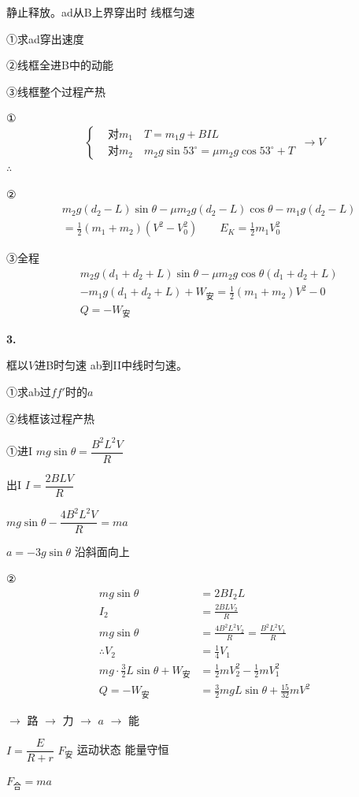 \begin{problem}
静止释放。ad从B上界穿出时 线框匀速

①求ad穿出速度

②线框全进B中的动能

③线框整个过程产热
\begin{solution}
①
\[ \left\{\begin{aligned} &\text{对}m_1\quad T=m_1g+BIL\\ &\text{对}m_2\quad m_2g\sin53^\circ=\mu m_2g\cos53^\circ+T\end{aligned}\right.\ \to V \]
$\therefore$ 

②
\begin{align*}
&m_2g(d_2-L)\sin\theta-\mu m_2g(d_2-L)\cos\theta-m_1g(d_2-L)\\
&=\frac12(m_1+m_2)(V^{2}-V_0^{2})\qquad E_K=\frac12 m_1V_0^{2}
\end{align*}

③全程
\begin{align*}
&m_2g(d_1+d_2+L)\sin\theta-\mu m_2g\cos\theta(d_1+d_2+L)\\
&-m_1g(d_1+d_2+L)+W_{\text{安}}=\frac12(m_1+m_2)V^{2}-0\\
&Q=-W_{\text{安}}
\end{align*}
\end{solution}
\end{problem}
\textbf{3.}

\begin{problem}
框以$V$进B时匀速 \quad ab到II中线时匀速。

①求ab过$ff'$时的$a$

②线框该过程产热
\begin{solution}
①进I \quad $mg\sin\theta=\dfrac{B^{2}L^{2}V}{R}$

出I \quad $I=\dfrac{2BLV}{R}$

$mg\sin\theta-\dfrac{4B^{2}L^{2}V}{R}=ma$

$a=-3g\sin\theta$ 沿斜面向上

②
\begin{align*}
mg\sin\theta&=2BI_2L\\
I_2&=\frac{2BLV_2}{R}\\
mg\sin\theta&=\frac{4B^{2}L^{2}V_2}{R}=\frac{B^{2}L^{2}V_1}{R}\\
\therefore V_2&=\frac14 V_1\\
mg\cdot\frac32 L\sin\theta+W_{\text{安}}&=\frac12 mV_2^{2}-\frac12 mV_1^{2}\\
Q=-W_{\text{安}}&=\frac32 mgL\sin\theta+\frac{15}{32}mV^{2}
\end{align*}
\end{solution}
\end{problem}
$\to$ 路 $\to$ 力 $\to$ $a$ $\to$ 能

$I=\dfrac{E}{R+r}$ \quad $F_{\text{安}}$ \quad 运动状态 \quad 能量守恒

$F_{\text{合}}=ma$
